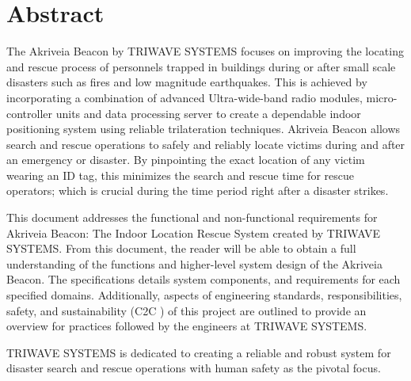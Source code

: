 
\section*{Abstract}	%
\medskip
The Akriveia Beacon by TRIWAVE SYSTEMS focuses on improving the locating and rescue process of personnels trapped in buildings during or after small scale disasters such as fires and low magnitude earthquakes. This is achieved by incorporating a combination of advanced Ultra-wide-band radio modules, micro-controller units and data processing server to create a dependable indoor positioning system using reliable trilateration techniques. Akriveia Beacon allows search and rescue operations to safely and reliably locate victims during and after an emergency or disaster. By pinpointing the exact location of any victim wearing an ID tag, this minimizes the search and rescue time for rescue operators; which is crucial during the time period right after a disaster strikes.

\bigskip
This document addresses the functional and non-functional requirements for Akriveia Beacon: The Indoor Location Rescue System created by TRIWAVE SYSTEMS. From this document, the reader will be able to obtain a full understanding of the functions and higher-level system design of the Akriveia Beacon. The specifications details system components, and requirements for each specified domains. Additionally, aspects of engineering standards, responsibilities, safety, and sustainability (C2C \cite{R25}) of this project are outlined to provide an overview for practices followed by the engineers at TRIWAVE SYSTEMS.

\bigskip
TRIWAVE SYSTEMS is dedicated to creating a reliable and robust system for disaster search and rescue operations with human safety as the pivotal focus.

%